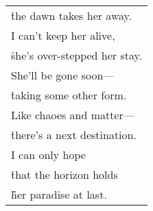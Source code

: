 \documentclass{article}
\begin{document}
\begin{center}
\begin{tabular}{l}
\h the dawn takes her away. \\
I can't keep her alive, \\
\h she's over-stepped her stay. \\
She'll be gone soon--- \\
\h taking some other form. \\
Like chaoes and matter--- \\
\h there's a next destination. \\
I can only hope \\
\h that the horizon holds \\
\h\h her paradise at last. \\
\end{tabular}
%
%
%
%
%

\end{center}
\end{document}
